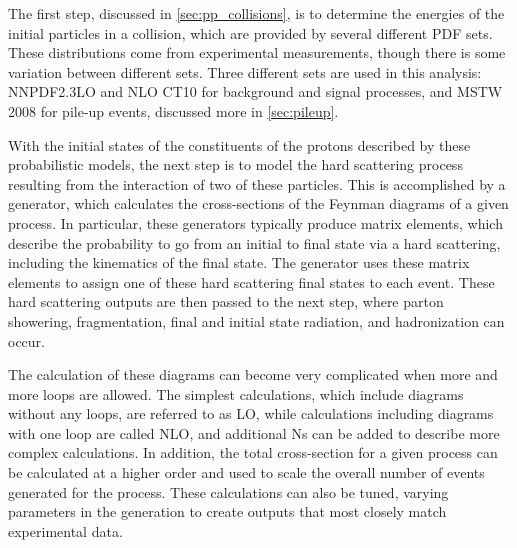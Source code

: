 The first step, discussed in \autoref{sec:pp_collisions}, is to determine the energies of the initial particles in a collision, which are provided by several different \ac{PDF} sets. These distributions come from experimental measurements, though there is some variation between different sets. Three different sets are used in this analysis: NNPDF2.3LO \cite{Ball:2012cx} and NLO CT10 \cite{Lai:2010vv} for background and signal processes, and MSTW 2008 \cite{0901.0002} for pile-up events, discussed more in \autoref{sec:pileup}. 

With the initial states of the constituents of the protons described by these probabilistic models, the next step is to model the hard scattering process resulting from the interaction of two of these particles. This is accomplished by a generator, which calculates the cross-sections of the Feynman diagrams of a given process. In particular, these generators typically produce matrix elements, which describe the probability to go from an initial to final state via a hard scattering, including the kinematics of the final state. The generator uses these matrix elements to assign one of these hard scattering final states to each event. These hard scattering outputs are then passed to the next step, where parton showering, fragmentation, final and initial state radiation, and hadronization can occur.

The calculation of these diagrams can become very complicated when more and more loops are allowed. The simplest calculations, which include diagrams without any loops, are referred to as \ac{LO}, while calculations including diagrams with one loop are called \ac{NLO}, and additional Ns can be added to describe more complex calculations. In addition, the total cross-section for a given process can be calculated at a higher order and used to scale the overall number of events generated for the process. These calculations can also be tuned, varying parameters in the generation to create outputs that most closely match experimental data. 

